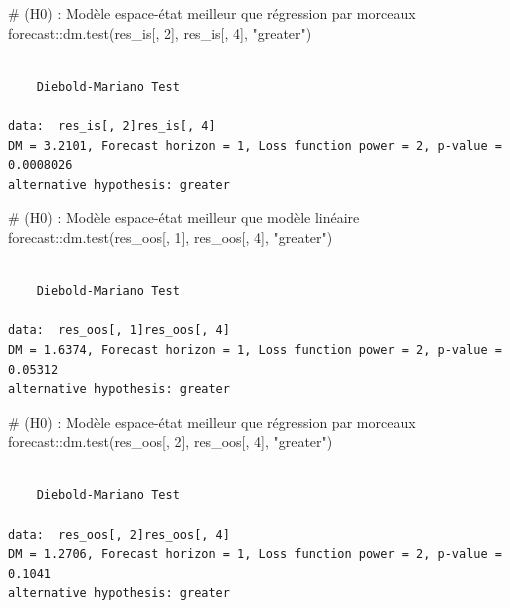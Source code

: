 \documentclass[
  a4paper,
  DIV=11,
  numbers=noendperiod,
  french]{scrartcl}
\newenvironment{Shaded}{\begin{snugshade}}{\end{snugshade}}
\newcommand{\CommentTok}[1]{\textcolor[rgb]{0.37,0.37,0.37}{#1}}
\newcommand{\DecValTok}[1]{\textcolor[rgb]{0.68,0.00,0.00}{#1}}
\newcommand{\FunctionTok}[1]{\textcolor[rgb]{0.28,0.35,0.67}{#1}}
\newcommand{\NormalTok}[1]{\textcolor[rgb]{0.00,0.23,0.31}{#1}}
\newcommand{\SpecialCharTok}[1]{\textcolor[rgb]{0.37,0.37,0.37}{#1}}
\newcommand{\StringTok}[1]{\textcolor[rgb]{0.13,0.47,0.30}{#1}}
\newcommand\1{{\mathds 1}}
\theoremstyle{remark}
\begin{document}
\begin{Shaded}
\begin{Highlighting}[]
\CommentTok{\# (H0) : Modèle espace{-}état meilleur que régression par morceaux}
\NormalTok{forecast}\SpecialCharTok{::}\FunctionTok{dm.test}\NormalTok{(res\_is[, }\DecValTok{2}\NormalTok{], res\_is[, }\DecValTok{4}\NormalTok{], }\StringTok{"greater"}\NormalTok{)}
\end{Highlighting}
\end{Shaded}

\begin{verbatim}

    Diebold-Mariano Test

data:  res_is[, 2]res_is[, 4]
DM = 3.2101, Forecast horizon = 1, Loss function power = 2, p-value =
0.0008026
alternative hypothesis: greater
\end{verbatim}

\begin{Shaded}
\begin{Highlighting}[]
\CommentTok{\# (H0) : Modèle espace{-}état meilleur que modèle linéaire}
\NormalTok{forecast}\SpecialCharTok{::}\FunctionTok{dm.test}\NormalTok{(res\_oos[, }\DecValTok{1}\NormalTok{], res\_oos[, }\DecValTok{4}\NormalTok{], }\StringTok{"greater"}\NormalTok{)}
\end{Highlighting}
\end{Shaded}

\begin{verbatim}

    Diebold-Mariano Test

data:  res_oos[, 1]res_oos[, 4]
DM = 1.6374, Forecast horizon = 1, Loss function power = 2, p-value =
0.05312
alternative hypothesis: greater
\end{verbatim}

\begin{Shaded}
\begin{Highlighting}[]
\CommentTok{\# (H0) : Modèle espace{-}état meilleur que régression par morceaux}
\NormalTok{forecast}\SpecialCharTok{::}\FunctionTok{dm.test}\NormalTok{(res\_oos[, }\DecValTok{2}\NormalTok{], res\_oos[, }\DecValTok{4}\NormalTok{], }\StringTok{"greater"}\NormalTok{)}
\end{Highlighting}
\end{Shaded}

\begin{verbatim}

    Diebold-Mariano Test

data:  res_oos[, 2]res_oos[, 4]
DM = 1.2706, Forecast horizon = 1, Loss function power = 2, p-value =
0.1041
alternative hypothesis: greater
\end{verbatim}
\end{document}
